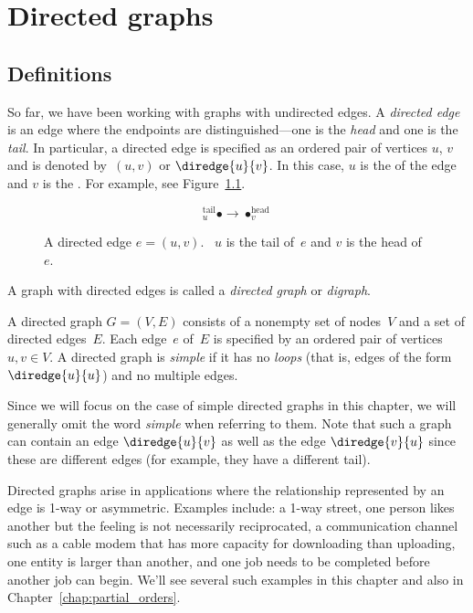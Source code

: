 \chapter{Directed graphs}\label{chap:digraphs}

\section{Definitions}

So far, we have been working with graphs with undirected edges.  A
\emph{directed edge} is an edge where the endpoints are
distinguished---one is the \emph{head} and one is the \emph{tail}.  In
particular, a directed edge is specified as an ordered pair of
vertices $u$, $v$ and is denoted by~$(u, v)$ or $\diredge{u}{v}$.  In this
case, $u$ is the  of the edge and $v$ is the .
For example, see Figure~\ref{fig:6EA}.

\begin{figure}

\begin{equation*}
    {}_u^{\text{tail}} \bullet \to \bullet_v^{\text{head}}
\end{equation*}

\missinggraphic

\caption{A directed edge $e = (u, v)$.  \ $u$ is the tail of~$e$ and
  $v$ is the head of~$e$.}

\label{fig:6EA}
\end{figure}

A graph with directed edges is called a \emph{directed graph} or
\emph{digraph}.

\begin{definition}\label{def:digraph}
A directed graph $G = (V, E)$ consists of a nonempty set of nodes~$V$
and a set of directed edges~$E$.  Each edge~$e$ of~$E$ is specified by
an ordered pair of vertices $u, v \in V$.  A directed graph
is \emph{simple} if it has no \emph{loops} (that is, edges of the form
$\diredge{u}{u}$) and no multiple edges.
\end{definition}

Since we will focus on the case of simple directed graphs in this
chapter, we will generally omit the word \emph{simple} when referring
to them.  Note that such a graph can contain an edge $\diredge{u}{v}$
as well as the edge $\diredge{v}{u}$ since these are different edges
(for example, they have a different tail).

Directed graphs arise in applications where the relationship
represented by an edge is 1-way or asymmetric.  Examples include: a
1-way street, one person likes another but the feeling is not
necessarily reciprocated, a communication channel such as a cable
modem that has more capacity for downloading than uploading, one
entity is larger than another, and one job needs to be completed
before another job can begin. We'll see several such examples in this
chapter and also in Chapter~\ref{chap:partial_orders}.

